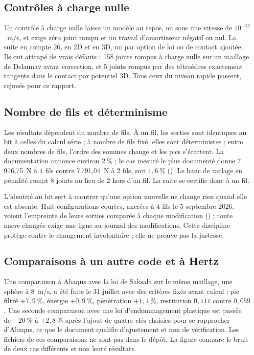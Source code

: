 \subsection{Contrôles à charge nulle}

Un contrôle à charge nulle laisse un modèle au repos, ou sous une vitesse de $10^{-12}$~m/s, et exige zéro joint rompu et un travail d'amortisseur négatif ou nul. La suite en compte 26, en 2D et en 3D, un par option de loi ou de contact ajoutée. Ils ont attrapé de vrais défauts : 158 joints rompus à charge nulle sur un maillage de Delaunay avant correction, et 5 joints rompus par des tétraèdres exactement tangents dans le contact par potentiel 3D. Tous ceux du niveau rapide passent, rejoués pour ce rapport.

\subsection{Nombre de fils et déterminisme}
\label{sec-fils}

Les résultats dépendent du nombre de fils. À un fil, les sorties sont identiques au bit à celles du calcul série ; à nombre de fils fixé, elles sont déterministes ; entre deux nombres de fils, l'ordre des sommes change et les pics s'écartent. La documentation annonce environ $2~\%$ ; le cas mesuré le plus documenté donne 7\,916,75~N à 4 fils contre 7\,791,04~N à 2 fils, soit $1{,}6~\%$ (). Le banc de raclage en pénalité rompt 8 joints au lieu de 2 hors d'un fil. La suite se certifie donc à un fil.

L'identité au bit sert à montrer qu'une option nouvelle ne change rien quand elle est absente. Huit configurations courtes, ancrées à 4 fils le 5 septembre 2026, voient l'empreinte de leurs sorties comparée à chaque modification () ; toute ancre changée exige une ligne au journal des modifications. Cette discipline protège contre le changement involontaire ; elle ne prouve pas la justesse.

\subsection{Comparaisons à un autre code et à Hertz}

Une comparaison à Abaqus avec la loi de Saksala sur le même maillage, une sphère à 8~m/s, a été faite le 31 juillet avec des critères fixés avant calcul : pic filtré $+7{,}9~\%$, énergie $+0{,}9~\%$, pénétration $+1{,}1~\%$, restitution $0{,}111$ contre $0{,}059$. Une seconde comparaison avec une loi d'endommagement plastique est passée de $-20~\%$ à $+2{,}8~\%$ après l'ajout de quatre clés choisies pour se rapprocher d'Abaqus, ce que le document qualifie d'ajustement et non de vérification. Les fichiers de ces comparaisons ne sont pas dans le dépôt. La figure  compare le bruit de deux cas différents et non leurs résultats.


